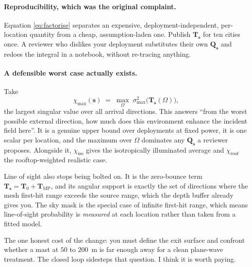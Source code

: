 \documentclass[11pt,a4paper]{article}
\newcommand{\bs}{\mathbf{s}}
\newcommand{\bT}{\mathbf{T}}
\begin{document}
\paragraph{Reproducibility, which was the original complaint.} Equation
\eqref{eq:factorise} separates an expensive, deployment-independent, per-location
quantity from a cheap, assumption-laden one. Publish $\bT_{\bs}$ for ten cities
once. A reviewer who dislikes your deployment substitutes their own
$\mathbf{Q}_{\bs}$ and redoes the integral in a notebook, without re-tracing
anything.

\paragraph{A defensible worst case actually exists.} Take
\begin{equation}
  \chi_{\max}(\bs) \;=\; \max_{\Omega}\;
  \sigma_{\max}^2\bigl(\bT_{\bs}(\Omega)\bigr),
\end{equation}
the largest singular value over all arrival directions. This answers ``from the
worst possible external direction, how much does this environment enhance the
incident field here''. It is a genuine upper bound over deployments at fixed
power, it is one scalar per location, and the maximum over $\Omega$ dominates any
$\mathbf{Q}_{\bs}$ a reviewer proposes. Alongside it, $\chi_{\text{iso}}$ gives
the isotropically illuminated average and $\chi_{\text{roof}}$ the rooftop-weighted
realistic case.

Line of sight also stops being bolted on. It is the zero-bounce term
$\bT_{\bs} = \bT_0 + \bT_{\text{MP}}$, and its angular support is exactly the set
of directions where the mesh first-hit range exceeds the source range, which the
depth buffer already gives you. The sky mask is the special case of infinite
first-hit range, which means line-of-sight probability is \emph{measured} at each
location rather than taken from a fitted model.

The one honest cost of the change: you must define the exit surface and confront
whether a mast at $50$ to $200$~m is far enough away for a clean plane-wave
treatment. The closed loop sidesteps that question. I think it is worth paying.
\end{document}
